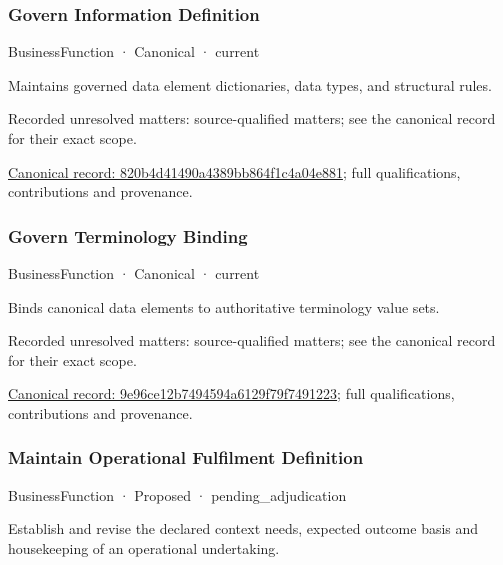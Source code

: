 \subsubsection{Govern Information Definition}

\label{element:820b4d41490a4389bb864f1c4a04e881}
{\small BusinessFunction · Canonical · current}\par

Maintains governed data element dictionaries, data types, and structural rules.


{\small Recorded unresolved matters: source-qualified matters; see the canonical record for their exact scope.}\par
{\footnotesize \href{../../../../continuum/business/business-function/820b4d41490a4389bb864f1c4a04e881.md}{Canonical record: 820b4d41490a4389bb864f1c4a04e881}; full qualifications, contributions and provenance.}\par
\subsubsection{Govern Terminology Binding}

\label{element:9e96ce12b7494594a6129f79f7491223}
{\small BusinessFunction · Canonical · current}\par

Binds canonical data elements to authoritative terminology value sets.


{\small Recorded unresolved matters: source-qualified matters; see the canonical record for their exact scope.}\par
{\footnotesize \href{../../../../continuum/business/business-function/9e96ce12b7494594a6129f79f7491223.md}{Canonical record: 9e96ce12b7494594a6129f79f7491223}; full qualifications, contributions and provenance.}\par
\subsubsection{Maintain Operational Fulfilment Definition}

\label{element:9f7085926221436bb672e52e59bca512}
{\small BusinessFunction · Proposed · pending\_adjudication}\par

Establish and revise the declared context needs, expected outcome basis and housekeeping of an operational undertaking.



